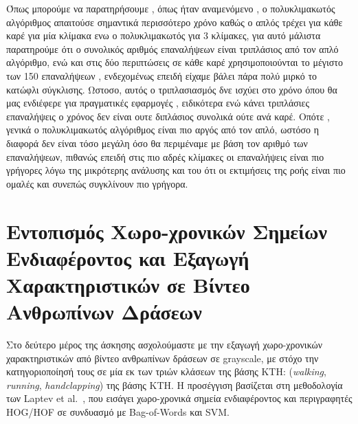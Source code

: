 \documentclass[12pt, a4paper]{article}
\begin{document}
\begin{table}[H]
\centering
\setlength{\tabcolsep}{3pt}
\footnotesize
{}
\caption{Σύγκριση του συνολικού υπολογιστικού κόστους και της ταχύτητας σύγκλισης μεταξύ Uni-scale και Multi-scale Lucas-Kanade στο συνολικό πείραμα παρακολούθησης.}
\label{table:lk_mlk_timing}
\end{table}

Όπως μπορούμε να παρατηρήσουμε , όπως ήταν αναμενόμενο , ο πολυκλιμακωτός αλγόριθμος απαιτούσε σημαντικά περισσότερο χρόνο καθώς ο απλός τρέχει για κάθε καρέ για μία κλίμακα ενω ο πολυκλιμακωτός για 3 κλίμακες, για αυτό μάλιστα παρατηρούμε ότι ο συνολικός αριθμός
επαναλήψεων είναι τριπλάσιος από τον απλό αλγόριθμο, ενώ και στις δύο περιπτώσεις σε κάθε καρέ χρησιμοποιούνται το μέγιστο των 150 επαναλήψεων , ενδεχομένως επειδή είχαμε βάλει πάρα πολύ μιρκό το κατώφλι σύγκλισης. Ωστοσο, αυτός ο τριπλασιασμός δνε ισχύει στο χρόνο όπου θα μας ενδιέφερε για πραγματικές εφαρμογές , ειδικότερα ενώ κάνει τριπλάσιες επαναλήψεις ο χρόνος δεν είναι ουτε διπλάσιος συνολικά ούτε ανά καρέ.
Οπότε , γενικά ο πολυκλιμακωτός αλγόριθμος είναι πιο αργός από τον απλό, ωστόσο η διαφορά δεν είναι τόσο μεγάλη όσο θα περιμέναμε με βάση τον αριθμό των επαναλήψεων, πιθανώς επειδή στις πιο αδρές κλίμακες οι επαναλήψεις είναι πιο γρήγορες λόγω της μικρότερης ανάλυσης και του ότι οι εκτιμήσεις της ροής είναι πιο ομαλές και συνεπώς συγκλίνουν πιο γρήγορα.
\section{Εντοπισμός Χωρο-χρονικών Σημείων Ενδιαφέροντος και Εξαγωγή Χαρακτηριστικών σε Βίντεο Ανθρωπίνων Δράσεων}

Στο δεύτερο μέρος της άσκησης ασχολούμαστε με την εξαγωγή χωρο-χρονικών χαρακτηριστικών
από βίντεο ανθρωπίνων δράσεων σε grayscale, με στόχο την κατηγοριοποίησή τους σε μία εκ των τριών κλάσεων της βάσης KTH: (\textit{walking}, \textit{running},
\textit{handclapping}) της βάσης KTH. Η προσέγγιση βασίζεται
στη μεθοδολογία των Laptev et al.~\cite{laptev2008}, που εισάγει χωρο-χρονικά σημεία
ενδιαφέροντος και περιγραφητές HOG/HOF σε συνδυασμό με Bag-of-Words και SVM.
\end{document}
